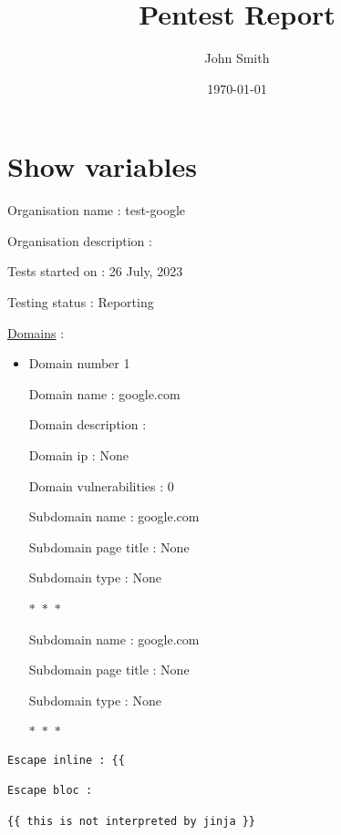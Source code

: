 \documentclass[a4paper,11pt]{book}
\title{Pentest Report} %
\author{John Smith} %
\date{\today} %
\begin{document}
 
\maketitle %

\section{Show variables}

Organisation name : test-google

Organisation description : 

Tests started on : 26 July, 2023\

Testing status : Reporting

\underline{Domains} :

\begin{itemize}
    \item Domain number 1

    Domain name : google.com

    Domain description : 
    
        Domain ip : None

    Domain vulnerabilities : 0
    


        Subdomain name : google.com

        Subdomain page title : None

        Subdomain type : None

        \begin{center}
            $\ast$~$\ast$~$\ast$
        \end{center}

        Subdomain name : google.com

        Subdomain page title : None

        Subdomain type : None

        \begin{center}
            $\ast$~$\ast$~$\ast$
        \end{center}

    


\end{itemize}


\begin{verbatim} 
Escape inline : {{

Escape bloc : 
 
{{ this is not interpreted by jinja }}

\end{verbatim}
\end{document}
